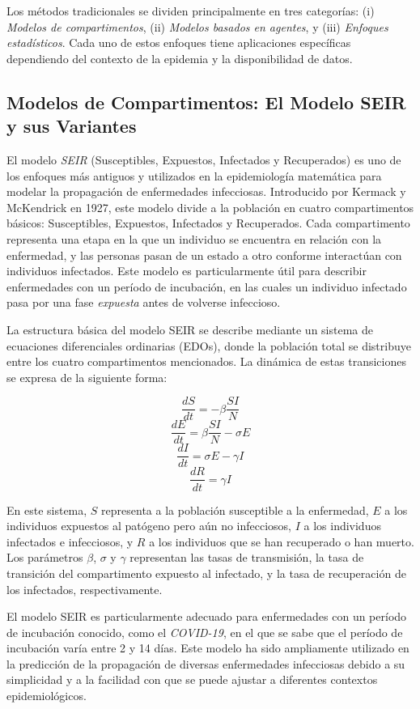 Los métodos tradicionales se dividen principalmente en tres categorías: (i) \textit{Modelos de compartimentos}, (ii) \textit{Modelos basados en agentes}, y (iii) \textit{Enfoques estadísticos}. Cada uno de estos enfoques tiene aplicaciones específicas dependiendo del contexto de la epidemia y la disponibilidad de datos.

\subsection{Modelos de Compartimentos: El Modelo SEIR y sus Variantes}\label{section:seir-model}

El modelo \textit{SEIR} (Susceptibles, Expuestos, Infectados y Recuperados) es uno de los enfoques más antiguos y utilizados en la epidemiología matemática para modelar la propagación de enfermedades infecciosas. Introducido por Kermack y McKendrick en 1927, este modelo divide a la población en cuatro compartimentos básicos: Susceptibles, Expuestos, Infectados y Recuperados. Cada compartimento representa una etapa en la que un individuo se encuentra en relación con la enfermedad, y las personas pasan de un estado a otro conforme interactúan con individuos infectados. Este modelo es particularmente útil para describir enfermedades con un período de incubación, en las cuales un individuo infectado pasa por una fase \textit{expuesta} antes de volverse infeccioso. 

La estructura básica del modelo SEIR se describe mediante un sistema de ecuaciones diferenciales ordinarias (EDOs), donde la población total se distribuye entre los cuatro compartimentos mencionados. La dinámica de estas transiciones se expresa de la siguiente forma:

\[
\frac{dS}{dt} = -\beta \frac{S I}{N}
\]
\[
\frac{dE}{dt} = \beta \frac{S I}{N} - \sigma E
\]
\[
\frac{dI}{dt} = \sigma E - \gamma I
\]
\[
\frac{dR}{dt} = \gamma I
\]

En este sistema, \(S\) representa a la población susceptible a la enfermedad, \(E\) a los individuos expuestos al patógeno pero aún no infecciosos, \(I\) a los individuos infectados e infecciosos, y \(R\) a los individuos que se han recuperado o han muerto. Los parámetros \(\beta\), \(\sigma\) y \(\gamma\) representan las tasas de transmisión, la tasa de transición del compartimento expuesto al infectado, y la tasa de recuperación de los infectados, respectivamente.

El modelo SEIR es particularmente adecuado para enfermedades con un período de incubación conocido, como el \textit{COVID-19}, en el que se sabe que el período de incubación varía entre 2 y 14 días. Este modelo ha sido ampliamente utilizado en la predicción de la propagación de diversas enfermedades infecciosas debido a su simplicidad y a la facilidad con que se puede ajustar a diferentes contextos epidemiológicos.


